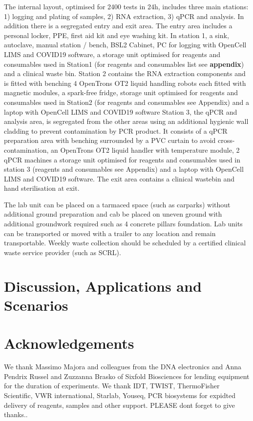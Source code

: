 \documentclass[a4paper,12pt]{article}
\begin{document}
The internal layout, optimised for 2400 tests in 24h, includes three main stations: 1) logging and plating of samples, 2) RNA extraction, 3) qPCR and analysis. In addition there is a segregated entry and exit area.  The entry area includes a personal locker, PPE, first aid kit and eye washing kit. In station 1, a sink, autoclave, manual station / bench, BSL2 Cabinet, PC for logging with OpenCell LIMS and COVID19 software, a storage unit optimised for reagents and consumables used in Station1 (for reagents and consumables list see \textbf{appendix}) and a clinical waste bin. Station 2 contains the RNA extraction components and is fitted with benching 4 OpenTrons OT2 liquid handling robots each fitted with magnetic modules, a spark-free fridge, storage unit optimised for reagents and consumables used in Station2 (for reagents and consumables see Appendix) and a laptop with OpenCell LIMS and COVID19 software Station 3, the qPCR and analysis area, is segregated from the other areas using an additional hygienic wall cladding to prevent contamination by PCR product. It consists of a qPCR preparation area with benching surrounded by a PVC curtain to avoid cross-contamination, an OpenTrons OT2 liquid handler with temperature module, 2 qPCR machines a storage unit optimised for reagents and consumables used in station 3 (reagents and consumables see Appendix) and a laptop with OpenCell LIMS and COVID19 software. The exit area contains a clinical wastebin and hand sterilisation at exit. 


The lab unit can be placed on a tarmaced space (such as carparks) without additional ground preparation and cab be placed on uneven ground with additional groundwork required such as 4 concrete pillars foundation. Lab units can be transported or moved with a trailer to any location and remain transportable. Weekly waste collection should be scheduled by a certified clinical waste service provider (such as SCRL). 


\section{Discussion, Applications and Scenarios}


\section{Acknowledgements}
We thank Massimo Majora and colleagues from the DNA electronics and Anna Pendrix Russel and Zuzzanna Brasko of Sixfold Biosciences for lending equipment for the duration of experiments. We thank IDT, TWIST, ThermoFisher Scientific, VWR international, Starlab, Youseq, PCR biosystems for expidted delivery of reagents, samples and other support. PLEASE dont forget to give thanks.. 



\end{document}
